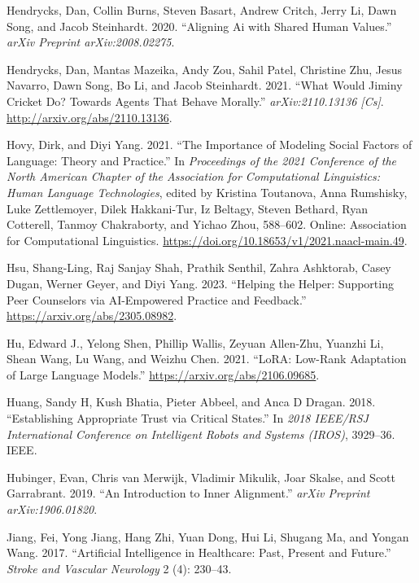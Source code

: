 \documentclass[
  letterpaper,
  DIV=11,
  numbers=noendperiod,
  oneside]{scrreprt}
\newlength{\cslhangindent}
\newenvironment{CSLReferences}[2] %
 {\begin{list}{}{%
  \setlength{\itemindent}{0pt}
  \setlength{\leftmargin}{0pt}
  \setlength{\parsep}{0pt}
  \ifodd #1
   \setlength{\leftmargin}{\cslhangindent}
   \setlength{\itemindent}{-1\cslhangindent}
  \fi
  \setlength{\itemsep}{#2\baselineskip}}}
 {\end{list}}
\theoremstyle{remark}
\begin{document}
\begin{CSLReferences}{1}{0}
Hendrycks, Dan, Collin Burns, Steven Basart, Andrew Critch, Jerry Li,
Dawn Song, and Jacob Steinhardt. 2020. {``Aligning Ai with Shared Human
Values.''} \emph{arXiv Preprint arXiv:2008.02275}.

Hendrycks, Dan, Mantas Mazeika, Andy Zou, Sahil Patel, Christine Zhu,
Jesus Navarro, Dawn Song, Bo Li, and Jacob Steinhardt. 2021. {``What
{Would} {Jiminy} {Cricket} {Do}? {Towards} {Agents} {That} {Behave}
{Morally}.''} \emph{arXiv:2110.13136 {[}Cs{]}}.
\url{http://arxiv.org/abs/2110.13136}.

Hovy, Dirk, and Diyi Yang. 2021. {``The Importance of Modeling Social
Factors of Language: Theory and Practice.''} In \emph{Proceedings of the
2021 Conference of the North American Chapter of the Association for
Computational Linguistics: Human Language Technologies}, edited by
Kristina Toutanova, Anna Rumshisky, Luke Zettlemoyer, Dilek Hakkani-Tur,
Iz Beltagy, Steven Bethard, Ryan Cotterell, Tanmoy Chakraborty, and
Yichao Zhou, 588--602. Online: Association for Computational
Linguistics. \url{https://doi.org/10.18653/v1/2021.naacl-main.49}.

Hsu, Shang-Ling, Raj Sanjay Shah, Prathik Senthil, Zahra Ashktorab,
Casey Dugan, Werner Geyer, and Diyi Yang. 2023. {``Helping the Helper:
Supporting Peer Counselors via AI-Empowered Practice and Feedback.''}
\url{https://arxiv.org/abs/2305.08982}.

Hu, Edward J., Yelong Shen, Phillip Wallis, Zeyuan Allen-Zhu, Yuanzhi
Li, Shean Wang, Lu Wang, and Weizhu Chen. 2021. {``LoRA: Low-Rank
Adaptation of Large Language Models.''}
\url{https://arxiv.org/abs/2106.09685}.

Huang, Sandy H, Kush Bhatia, Pieter Abbeel, and Anca D Dragan. 2018.
{``Establishing Appropriate Trust via Critical States.''} In \emph{2018
IEEE/RSJ International Conference on Intelligent Robots and Systems
(IROS)}, 3929--36. IEEE.

Hubinger, Evan, Chris van Merwijk, Vladimir Mikulik, Joar Skalse, and
Scott Garrabrant. 2019. {``An Introduction to Inner Alignment.''}
\emph{arXiv Preprint arXiv:1906.01820}.

Jiang, Fei, Yong Jiang, Hang Zhi, Yuan Dong, Hui Li, Shugang Ma, and
Yongan Wang. 2017. {``Artificial Intelligence in Healthcare: Past,
Present and Future.''} \emph{Stroke and Vascular Neurology} 2 (4):
230--43.


\end{CSLReferences}
\end{document}
